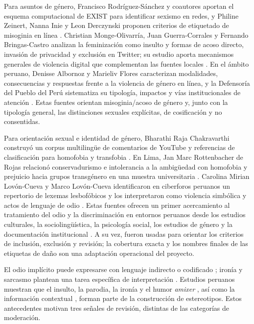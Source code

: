 Para asuntos de género, Francisco Rodríguez-Sánchez y coautores aportan el esquema computacional de EXIST para identificar sexismo en redes, y Philine Zeinert, Nanna Inie y Leon Derczynski proponen criterios de etiquetado de misoginia en línea \cite{rodriguez2021exist,zeinert2021misogyny}. Christian Monge-Olivarría, Juan Guerra-Corrales y Fernando Bringas-Castro analizan la feminización como insulto y formas de acoso directo, invasión de privacidad y exclusión en Twitter; su estudio aporta mecanismos generales de violencia digital que complementan las fuentes locales \cite{monge2023violencia}. En el ámbito peruano, Denisse Albornoz y Marieliv Flores caracterizan modalidades, consecuencias y respuestas frente a la violencia de género en línea, y la Defensoría del Pueblo del Perú sistematiza su tipología, impactos y vías institucionales de atención \cite{albornoz2018conocer,defensoria2021violenciaenlinea}. Estas fuentes orientan misoginia/acoso de género y, junto con la tipología general, las distinciones sexuales explícitas, de cosificación y no consentidas.

Para orientación sexual e identidad de género, Bharathi Raja Chakravarthi construyó un corpus multilingüe de comentarios de YouTube y referencias de clasificación para homofobia y transfobia \cite{chakravarthi2024homotrans}. En Lima, Jan Marc Rottenbacher de Rojas relacionó conservadurismo e intolerancia a la ambigüedad con homofobia y prejuicio hacia grupos transgénero en una muestra universitaria \cite{rottenbacher2012homofobia}. Carolina Mirian Lovón-Cueva y Marco Lovón-Cueva identificaron en ciberforos peruanos un repertorio de lexemas lesbofóbicos y los interpretaron como violencia simbólica y actos de lenguaje de odio \cite{lovon2022lesbofobia}. Estas fuentes ofrecen un primer acercamiento al tratamiento del odio y la discriminación en entornos peruanos desde los estudios culturales, la sociolingüística, la psicología social, los estudios de género y la documentación institucional \cite{zavala2017racismo,almeida2022motoso,albornoz2018conocer,defensoria2021violenciaenlinea,rottenbacher2012homofobia,lovon2022lesbofobia}. A su vez, fueron usadas para orientar los criterios de inclusión, exclusión y revisión; la cobertura exacta y los nombres finales de las etiquetas de daño son una adaptación operacional del proyecto.

El odio implícito puede expresarse con lenguaje indirecto o codificado \cite{elsherief2021implicit}; ironía y sarcasmo plantean una tarea específica de interpretación \cite{ilic2018irony}. Estudios peruanos muestran que el insulto, la parodia, la ironía y el humor \emph{amixer} \cite{salem2016amixer}, así como la información contextual \cite{bourgeade2024context}, forman parte de la construcción de estereotipos. Estos antecedentes motivan tres señales de revisión, distintas de las categorías de moderación.

